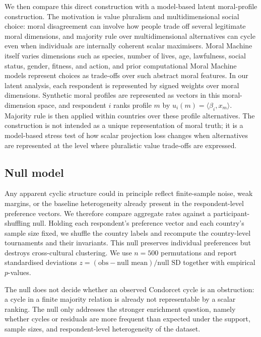 \documentclass[10pt]{article}
\theoremstyle{definition}
\theoremstyle{remark}
\begin{document}
We then compare this direct construction with a model-based latent moral-profile construction. The motivation is value pluralism and multidimensional social choice: moral disagreement can involve how people trade off several legitimate moral dimensions, and majority rule over multidimensional alternatives can cycle even when individuals are internally coherent scalar maximisers\cite{berlin1969,raz1986,plott1967,mckelvey1976}. Moral Machine itself varies dimensions such as species, number of lives, age, lawfulness, social status, gender, fitness, and action, and prior computational Moral Machine models represent choices as trade-offs over such abstract moral features\cite{awad2018,noothigattu2018,kim2018moral}. In our latent analysis, each respondent is represented by signed weights over moral dimensions. Synthetic moral profiles are represented as vectors in this moral-dimension space, and respondent $i$ ranks profile $m$ by $u_i(m)=\langle \beta_i,x_m\rangle$. Majority rule is then applied within countries over these profile alternatives. The construction is not intended as a unique representation of moral truth; it is a model-based stress test of how scalar projection loss changes when alternatives are represented at the level where pluralistic value trade-offs are expressed.

\subsection{Null model}

Any apparent cyclic structure could in principle reflect finite-sample noise, weak margins, or the baseline heterogeneity already present in the respondent-level preference vectors. We therefore compare aggregate rates against a participant-shuffling null. Holding each respondent's preference vector and each country's sample size fixed, we shuffle the country labels and recompute the country-level tournaments and their invariants. This null preserves individual preferences but destroys cross-cultural clustering. We use $n=500$ permutations and report standardised deviations $z=(\text{obs}-\text{null mean})/\text{null SD}$ together with empirical $p$-values.

The null does not decide whether an observed Condorcet cycle is an obstruction: a cycle in a finite majority relation is already not representable by a scalar ranking. The null only addresses the stronger enrichment question, namely whether cycles or residuals are more frequent than expected under the support, sample sizes, and respondent-level heterogeneity of the dataset.
\end{document}
